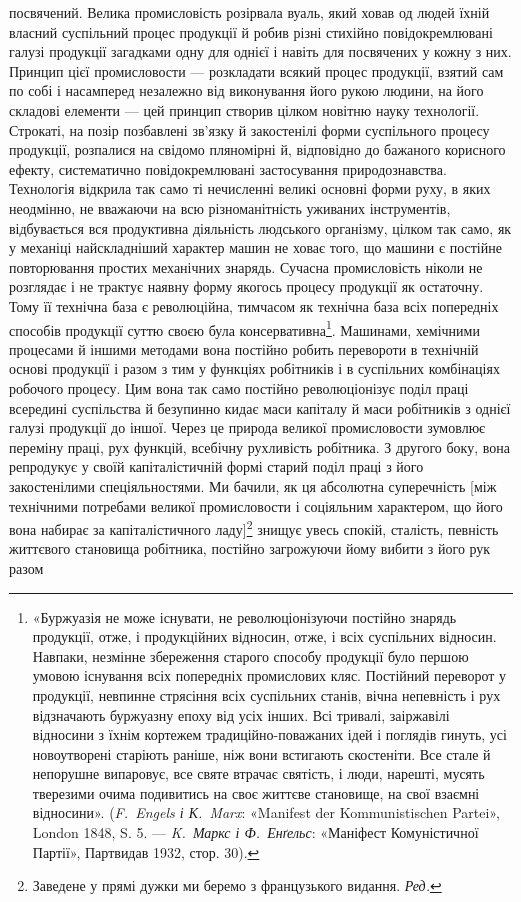 \parcont{}  %
посвячений. Велика промисловість розірвала вуаль, який ховав
од людей їхній власний суспільний процес продукції й робив
різні стихійно повідокремлювані галузі продукції загадками
одну для однієї і навіть для посвячених у кожну з них. Принцип
цієї промисловости — розкладати всякий процес продукції, взятий
сам по собі і насамперед незалежно від виконування його
рукою людини, на його складові елементи — цей принцип створив
цілком новітню науку технології. Строкаті, на позір позбавлені
зв’язку й закостенілі форми суспільного процесу продукції,
розпалися на свідомо пляномірні й, відповідно до бажаного корисного
ефекту, систематично повідокремлювані застосування
природознавства. Технологія відкрила так само ті нечисленні
великі основні форми руху, в яких неодмінно, не вважаючи на
всю різноманітність уживаних інструментів, відбувається вся
продуктивна діяльність людського організму, цілком так само,
як у механіці найскладніший характер машин не ховає того,
що машини є постійне повторювання простих механічних знарядь.
Сучасна промисловість ніколи не розглядає і не трактує наявну
форму якогось процесу продукції як остаточну. Тому її технічна
база є революційна, тимчасом як технічна база всіх попередніх
способів продукції суттю своєю була консервативна\footnote{
«Буржуазія не може існувати, не революціонізуючи постійно
знарядь продукції, отже, і продукційних відносин, отже, і всіх суспільних
відносин. Навпаки, незмінне збереження старого способу продукції було
першою умовою існування всіх попередніх промислових кляс. Постійний
переворот у продукції, невпинне стрясіння всіх суспільних станів, вічна
непевність і рух відзначають буржуазну епоху від усіх інших. Всі тривалі,
заіржавілі відносини з їхнім кортежем традиційно-поважаних ідей і
поглядів гинуть, усі новоутворені старіють раніше, ніж вони встигають
скостеніти. Все стале й непорушне випаровує, все святе втрачає святість,
і люди, нарешті, мусять тверезими очима подивитись на своє життєве
становище, на свої взаємні відносини». (\emph{F.~Engels і К.~Marx}: «Manifest
der Kommunistischen Partei», London 1848, S. 5. — \emph{K.~Маркс
і Ф.~Енґельс}: «Маніфест Комуністичної Партії», Партвидав 1932, стор. 30).
}. Машинами, хемічними процесами й іншими методами вона постійно
робить перевороти в технічній основі продукції і разом з тим
у функціях робітників і в суспільних комбінаціях робочого процесу.
Цим вона так само постійно революціонізує поділ праці
всередині суспільства й безупинно кидає маси капіталу й маси
робітників з однієї галузі продукції до іншої. Через це природа
великої промисловости зумовлює переміну праці, рух функцій,
всебічну рухливість робітника. З другого боку, вона репродукує
у своїй капіталістичній формі старий поділ праці з його закостенілими
спеціяльностями. Ми бачили, як ця абсолютна суперечність
[між технічними потребами великої промисловости і соціяльним
характером, що його вона набирає за капіталістичного ладу]\footnote*{
Заведене у прямі дужки ми беремо з французького видання. \emph{Ред.}
}
знищує увесь спокій, сталість, певність життєвого становища
робітника, постійно загрожуючи йому вибити з його рук разом
\parbreak{}  %
